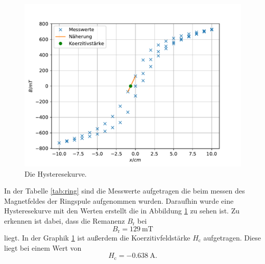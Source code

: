 \begin{figure}
\centering
\includegraphics[width=\textwidth]{content/data/plot_ring.pdf}
\caption{Die Hysteresekurve.}
\label{fig:ring}
\end{figure}

In der Tabelle \ref{tab:ring} sind die Messwerte aufgetragen die beim messen des Magnetfeldes der Ringspule aufgenommen wurden.
Daraufhin wurde eine Hysteresekurve mit den Werten erstellt die in Abbildung \ref{fig:ring} zu sehen ist.
Zu erkennen ist dabei, dass die Remanenz $B_\text{r}$ bei 
\begin{equation*}
  B_\text{r} =\SI{129}{\milli\tesla}
\end{equation*}
liegt.
In der Graphik \ref{fig:ring} ist außerdem die Koerzitivfeldstärke $H_\text{c}$ aufgetragen.
Diese liegt bei einem Wert von
\begin{equation*}
  H_\text{c} =\SI{-0.638}{\ampere}.
\end{equation*}
